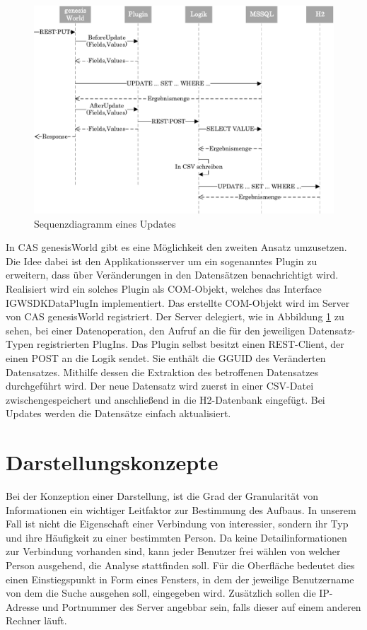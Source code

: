 \begin{figure}[htbp]
\centering
  \includegraphics[width=1.0\textwidth, width=1.0\textwidth]{pics/sequenzdiagramm.pdf}
\caption{Sequenzdiagramm eines Updates}
\label{konzept_sequenz}
\end{figure}

In CAS genesisWorld gibt es eine Möglichkeit den zweiten Ansatz umzusetzen. Die Idee dabei ist den Applikationsserver um ein sogenanntes Plugin zu erweitern, dass über Veränderungen in den Datensätzen benachrichtigt wird. Realisiert wird ein solches Plugin als COM-Objekt, welches das Interface IGWSDKDataPlugIn implementiert. Das erstellte COM-Objekt wird im Server von CAS genesisWorld registriert. Der Server delegiert, wie in Abbildung \ref{konzept_sequenz} zu sehen, bei einer Datenoperation, den Aufruf an die für den jeweiligen Datensatz-Typen registrierten PlugIns. Das Plugin selbst besitzt einen REST-Client, der einen POST an die Logik sendet. Sie enthält die GGUID des Veränderten Datensatzes. Mithilfe dessen die Extraktion des betroffenen Datensatzes durchgeführt wird. Der neue Datensatz wird zuerst in einer CSV-Datei zwischengespeichert und anschließend in die H2-Datenbank eingefügt. Bei Updates werden die Datensätze einfach aktualisiert. 

\section{Darstellungskonzepte}
\label{ch:Konzeption:sec:Darstellungskonzepte}

Bei der Konzeption einer Darstellung, ist die Grad der Granularität von Informationen ein wichtiger Leitfaktor zur Bestimmung des Aufbaus. In unserem Fall ist nicht die Eigenschaft einer Verbindung von interessier, sondern ihr Typ und ihre Häufigkeit zu einer bestimmten Person. Da keine Detailinformationen zur Verbindung vorhanden sind, kann jeder Benutzer frei wählen von welcher Person ausgehend, die Analyse stattfinden soll. Für die Oberfläche bedeutet dies einen Einstiegspunkt in Form eines Fensters, in dem der jeweilige Benutzername von dem die Suche ausgehen soll, eingegeben wird. Zusätzlich sollen die IP-Adresse und Portnummer des Server angebbar sein, falls dieser auf einem anderen Rechner läuft.

